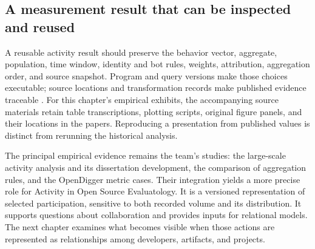 \subsection{A measurement result that can be inspected and reused}
A reusable activity result should preserve the behavior vector, aggregate, population, time window, identity and bot rules, weights, attribution, aggregation order, and source snapshot. Program and query versions make those choices executable; source locations and transformation records make published evidence traceable \citep{sandve2013}. For this chapter's empirical exhibits, the accompanying source materials retain table transcriptions, plotting scripts, original figure panels, and their locations in the papers. Reproducing a presentation from published values is distinct from rerunning the historical analysis.

The principal empirical evidence remains the team's studies: the large-scale activity analysis and its dissertation development, the comparison of aggregation rules, and the OpenDigger metric cases. Their integration yields a more precise role for Activity in Open Source Evaluatology. It is a versioned representation of selected participation, sensitive to both recorded volume and its distribution. It supports questions about collaboration and provides inputs for relational models. The next chapter examines what becomes visible when those actions are represented as relationships among developers, artifacts, and projects.

